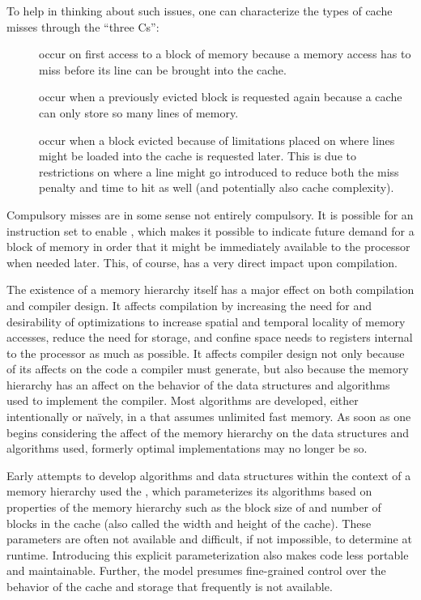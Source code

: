 To help in thinking about such issues, one can characterize the types of cache misses through the ``three Cs'':
\begin{description}
\item[] occur on first access to a block of memory because a memory access has to miss before its line can be brought into the cache.
\item[] occur when a previously evicted block is requested again because a cache can only store so many lines of memory.
\item[] occur when a block evicted because of limitations placed on where lines might be loaded into the cache is requested later. This is due to restrictions on where a line might go introduced to reduce both the miss penalty and time to hit as well (and potentially also cache complexity).
\end{description}
Compulsory misses are in some sense not entirely compulsory. It is possible for an instruction set to enable , which makes it possible to indicate future demand for a block of memory in order that it might be immediately available to the processor when needed later. This, of course, has a very direct impact upon compilation.

The existence of a memory hierarchy itself has a major effect on both compilation and compiler design. It affects compilation by increasing the need for and desirability of optimizations to increase spatial and temporal locality of memory accesses, reduce the need for storage, and confine space needs to registers internal to the processor as much as possible. It affects compiler design not only because of its affects on the code a compiler must generate, but also because the memory hierarchy has an affect on the behavior of the data structures and algorithms used to implement the compiler. Most algorithms are developed, either intentionally or na\"ively, in a  that assumes unlimited fast memory. As soon as one begins considering the affect of the memory hierarchy on the data structures and algorithms used, formerly optimal implementations may no longer be so.

Early attempts to develop algorithms and data structures within the context of a memory hierarchy used the , which parameterizes its algorithms based on properties of the memory hierarchy such as the block size of and number of blocks in the cache (also called the width and height of the cache). These parameters are often not available and difficult, if not impossible, to determine at runtime. Introducing this explicit parameterization also makes code less portable and maintainable. Further, the model presumes fine-grained control over the behavior of the cache and storage that frequently is not available.

